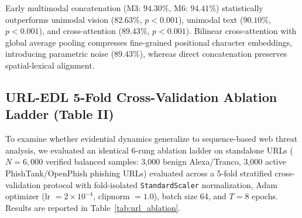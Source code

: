 \documentclass[conference]{IEEEtran}
\begin{document}
\begin{table}[htbp]
\caption{Quish-EDL 5-Fold Cross-Validation \& Ablation Performance (Mean $\pm$ Std)}
\label{tab:ablation}
\centering
{}
\end{table}

Early multimodal concatenation (M3: $94.30\%$, M6: $94.41\%$) statistically outperforms unimodal vision ($82.63\%$, $p < 0.001$), unimodal text ($90.10\%$, $p < 0.001$), and cross-attention ($89.43\%$, $p < 0.001$). Bilinear cross-attention with global average pooling compresses fine-grained positional character embeddings, introducing parametric noise ($89.43\%$), whereas direct concatenation preserves spatial-lexical alignment.

\subsection{URL-EDL 5-Fold Cross-Validation Ablation Ladder (Table II)}
To examine whether evidential dynamics generalize to sequence-based web threat analysis, we evaluated an identical 6-rung ablation ladder on standalone URLs ($N=6,000$ verified balanced samples: 3,000 benign Alexa/Tranco, 3,000 active PhishTank/OpenPhish phishing URLs) evaluated across a 5-fold stratified cross-validation protocol with fold-isolated \texttt{StandardScaler} normalization, Adam optimizer (lr $= 2 \times 10^{-4}$, clipnorm $= 1.0$), batch size 64, and $T=8$ epochs. Results are reported in Table~\ref{tab:url_ablation}.
\end{document}
